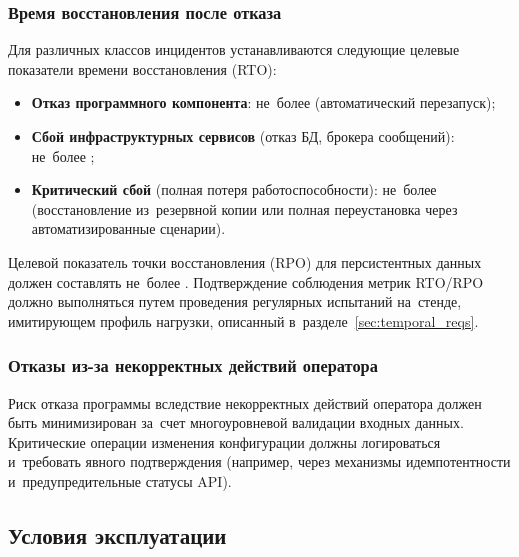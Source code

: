 \documentclass[12pt,a4paper]{extarticle}
\begin{document}
\subsubsection{Время восстановления после отказа}

\begin{hseExample}
Для различных классов инцидентов устанавливаются следующие целевые показатели времени восстановления (RTO):
\begin{itemize}[nosep, leftmargin=1.25cm]
    \item \textbf{Отказ программного компонента}: не~более  (автоматический перезапуск);
    \item \textbf{Сбой инфраструктурных сервисов} (отказ БД, брокера сообщений): не~более ;
    \item \textbf{Критический сбой} (полная потеря работоспособности): не~более  (восстановление из~резервной копии или полная переустановка через автоматизированные сценарии).
\end{itemize}

Целевой показатель точки восстановления (RPO) для персистентных данных должен составлять не~более . Подтверждение соблюдения метрик RTO/RPO должно выполняться путем проведения регулярных испытаний на~стенде, имитирующем профиль нагрузки, описанный в~разделе~\ref{sec:temporal_reqs}.
\end{hseExample}

\subsubsection{Отказы из-за некорректных действий оператора}

\begin{hseExample}
Риск отказа программы вследствие некорректных действий оператора должен быть минимизирован за~счет многоуровневой валидации входных данных. Критические операции изменения конфигурации должны логироваться и~требовать явного подтверждения (например, через механизмы идемпотентности и~предупредительные статусы API).
\end{hseExample}

\clearpage

\subsection{Условия эксплуатации}
\end{document}

